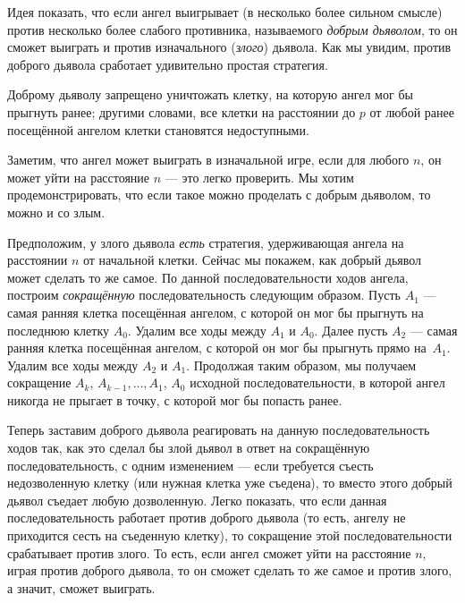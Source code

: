 Идея показать, что если ангел выигрывает (в несколько более сильном смысле) против несколько более слабого противника, называемого \emph{добрым дьяволом}, то он сможет выиграть и против изначального (\emph{злого}) дьявола.
Как мы увидим, против доброго дьявола сработает удивительно простая стратегия.

Доброму дьяволу запрещено уничтожать клетку, на которую ангел мог бы прыгнуть ранее;
другими словами, все клетки на расстоянии до $p$ от любой ранее посещённой ангелом клетки становятся недоступными.

Заметим, что ангел может выиграть в изначальной игре, если для любого $n$, он может уйти на расстояние $n$ ---
это легко проверить.
Мы хотим продемонстрировать, что если такое можно проделать с добрым дьяволом, то можно и со злым.

Предположим, у злого дьявола \emph{есть} стратегия, удерживающая ангела на расстоянии $n$ от начальной клетки.
Сейчас мы покажем, как добрый дьявол может сделать то же самое.
По данной последовательности ходов ангела, построим \emph{сокращённую} последовательность следующим образом.
Пусть $A_1$ --- самая ранняя клетка посещённая ангелом, с которой он мог бы прыгнуть на последнюю клетку $A_0$.
Удалим все ходы между $A_1$ и $A_0$.
Далее пусть $A_2$ --- самая ранняя клетка посещённая ангелом, с которой он мог бы прыгнуть прямо на~$A_1$.
Удалим все ходы между $A_2$ и $A_1$.
Продолжая таким образом, мы получаем сокращение $A_k$, $A_{k-1}, \dots, A_1$, $A_0$ исходной последовательности, в которой ангел никогда не прыгает в точку, с которой мог бы попасть ранее.

Теперь заставим доброго дьявола реагировать на данную последовательность ходов так, как это сделал бы злой дьявол в ответ на сокращённую последовательность, с одним изменением --- если требуется съесть недозволенную клетку (или нужная клетка уже съедена), то вместо этого добрый дьявол съедает любую дозволенную.
Легко показать, что если данная последовательность работает против доброго дьявола (то есть, ангелу не приходится сесть на съеденную клетку), то сокращение этой последовательности срабатывает против злого.
То есть, если ангел сможет уйти на расстояние $n$, играя против доброго дьявола, то он сможет сделать то же самое и против злого, а значит, сможет выиграть.

